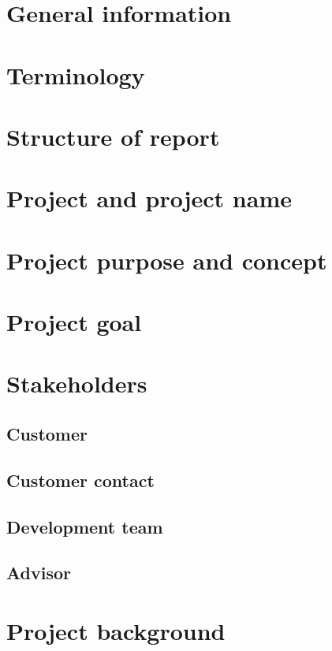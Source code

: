 \section{General information}
\section {Terminology}
\section{Structure of report}
\section{Project and project name}
\section{Project purpose and concept}
\section{Project goal}
\section{Stakeholders}
\subsection{Customer}
\subsection{Customer contact}
\subsection{Development team}
\subsection{Advisor}
\section{Project background}